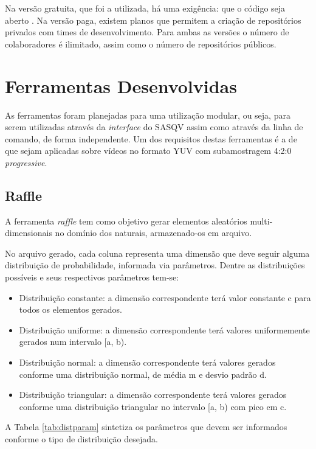 Na versão gratuita, que foi a utilizada, há uma exigência: que o código seja aberto \cite{githubabout}. Na versão paga, existem planos que permitem a criação de repositórios privados com times de desenvolvimento. Para ambas as versões o número de colaboradores é ilimitado, assim como o número de repositórios públicos.

\section{Ferramentas Desenvolvidas}
\label{des:ferramentas}

As ferramentas foram planejadas para uma utilização modular, ou seja, para serem utilizadas através da \emph{interface} do SASQV assim como através da linha de comando, de forma independente. Um dos requisitos destas ferramentas é a de que sejam aplicadas sobre vídeos no formato YUV com subamostragem 4:2:0 \emph{progressive}.

\subsection{Raffle}
\label{des:raffle}

A ferramenta \emph{raffle} tem como objetivo gerar elementos aleatórios multi-dimensionais no domínio dos naturais, armazenado-os em arquivo.

No arquivo gerado, cada coluna representa uma dimensão que deve seguir alguma distribuição de probabilidade, informada via parâmetros. Dentre as distribuições possíveis e seus respectivos parâmetros tem-se: 

\begin{itemize}
	\item Distribuição constante: a dimensão correspondente terá valor constante c para todos os elementos gerados.
	\item Distribuição uniforme: a dimensão correspondente terá valores uniformemente gerados num intervalo [a, b).
	\item Distribuição normal: a dimensão correspondente terá valores gerados conforme uma distribuição normal, de média m e desvio padrão d.
	\item Distribuição triangular: a dimensão correspondente terá valores gerados conforme uma distribuição triangular no intervalo [a, b) com pico em c.
\end{itemize}

A Tabela \ref{tab:distparam} sintetiza os parâmetros que devem ser informados conforme o tipo de distribuição desejada.

